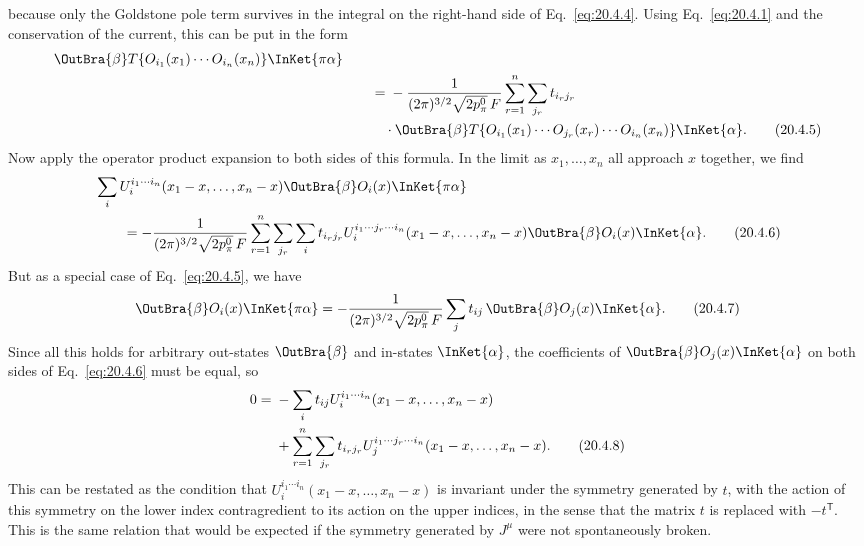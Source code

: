 because only the Goldstone pole term survives in the integral on the right-hand side of Eq.~\eqref{eq:20.4.4}. Using Eq.~\eqref{eq:20.4.1} and the conservation of the current, this can be put in the form
\begin{align}
\OutBra{\beta}
T\{O_{i_1}(x_1)\cdots O_{i_n}(x_n)\}\InKet{\pi\alpha}
&\notag\\
&\qquad={}-\frac{1}{(2\pi)^{3/2}\sqrt{2p_\pi^0}\,F}
\sum_{r=1}^n\sum_{j_r}t_{i_rj_r}
\notag\\
&\qquad\quad{}\cdot\OutBra{\beta}
T\{O_{i_1}(x_1)\cdots O_{j_r}(x_r)\cdots O_{i_n}(x_n)\}
\InKet{\alpha}.
\tag{20.4.5}\label{eq:20.4.5}
\end{align}
Now apply the operator product expansion to both sides of this formula. In the limit as $x_1,\ldots,x_n$ all approach $x$ together, we find
\begin{align}
&\sum_i U_i^{i_1\cdots i_n}(x_1-x,\ldots,x_n-x)
\OutBra{\beta}O_i(x)\InKet{\pi\alpha}
\notag\\
&\qquad=-\frac{1}{(2\pi)^{3/2}\sqrt{2p_\pi^0}\,F}
\sum_{r=1}^n\sum_{j_r}\sum_i t_{i_rj_r}
U_i^{i_1\cdots j_r\cdots i_n}(x_1-x,\ldots,x_n-x)
\OutBra{\beta}O_i(x)\InKet{\alpha}.
\tag{20.4.6}\label{eq:20.4.6}
\end{align}
But as a special case of Eq.~\eqref{eq:20.4.5}, we have
\begin{equation}
\OutBra{\beta}O_i(x)\InKet{\pi\alpha}
=-\frac{1}{(2\pi)^{3/2}\sqrt{2p_\pi^0}\,F}
\sum_j t_{ij}\,\OutBra{\beta}O_j(x)
\InKet{\alpha}.
\tag{20.4.7}\label{eq:20.4.7}
\end{equation}
Since all this holds for arbitrary out-states
$\OutBra{\beta}$ and in-states
$\InKet{\alpha}$, the coefficients of
$\OutBra{\beta}O_j(x)\InKet{\alpha}$ on both
sides of Eq.~\eqref{eq:20.4.6} must be equal, so
\begin{align}
0={}&-\sum_i t_{ij}U_i^{i_1\cdots i_n}(x_1-x,\ldots,x_n-x)
\notag\\
&+\sum_{r=1}^n\sum_{j_r}t_{i_rj_r}
U_j^{i_1\cdots j_r\cdots i_n}(x_1-x,\ldots,x_n-x).
\tag{20.4.8}\label{eq:20.4.8}
\end{align}
This can be restated as the condition that $U_i^{i_1\cdots i_n}(x_1-x,\ldots,x_n-x)$ is invariant under the symmetry generated by $t$, with the action of this symmetry on the lower index contragredient to its action on the upper indices, in the sense that the matrix $t$ is replaced with $-t^{\mathsf T}$. This is the same relation that would be expected if the symmetry generated by $J^\mu$ were not spontaneously broken.
